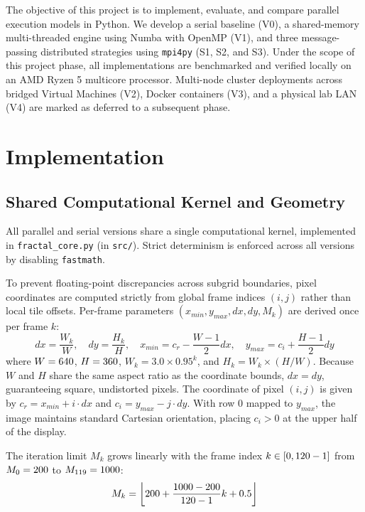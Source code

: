\documentclass[11pt,a4paper]{article}
\begin{document}
The objective of this project is to implement, evaluate, and compare parallel execution models in Python. We develop a serial baseline (V0), a shared-memory multi-threaded engine using Numba with OpenMP (V1), and three message-passing distributed strategies using \texttt{mpi4py} (S1, S2, and S3). Under the scope of this project phase, all implementations are benchmarked and verified locally on an AMD Ryzen 5 multicore processor. Multi-node cluster deployments across bridged Virtual Machines (V2), Docker containers (V3), and a physical lab LAN (V4) are marked as deferred to a subsequent phase.

\section{Implementation}
\label{sec:implementation}

\subsection{Shared Computational Kernel and Geometry}
All parallel and serial versions share a single computational kernel, implemented in \texttt{fractal\_core.py} (in \texttt{src/}). Strict determinism is enforced across all versions by disabling \texttt{fastmath}. 

To prevent floating-point discrepancies across subgrid boundaries, pixel coordinates are computed strictly from global frame indices $(i, j)$ rather than local tile offsets. Per-frame parameters $(x_{min}, y_{max}, dx, dy, M_k)$ are derived once per frame $k$:
\begin{equation}
dx = \frac{W_k}{W}, \quad dy = \frac{H_k}{H}, \quad x_{min} = c_r - \frac{W - 1}{2} dx, \quad y_{max} = c_i + \frac{H - 1}{2} dy
\end{equation}
where $W = 640$, $H = 360$, $W_k = 3.0 \times 0.95^k$, and $H_k = W_k \times (H / W)$. Because $W$ and $H$ share the same aspect ratio as the coordinate bounds, $dx = dy$, guaranteeing square, undistorted pixels. The coordinate of pixel $(i, j)$ is given by $c_r = x_{min} + i \cdot dx$ and $c_i = y_{max} - j \cdot dy$. With row 0 mapped to $y_{max}$, the image maintains standard Cartesian orientation, placing $c_i > 0$ at the upper half of the display.

The iteration limit $M_k$ grows linearly with the frame index $k \in [0, 120 - 1]$ from $M_0 = 200$ to $M_{119} = 1000$:
\begin{equation}
M_k = \left\lfloor 200 + \frac{1000 - 200}{120 - 1} k + 0.5 \right\rfloor
\end{equation}
\end{document}
